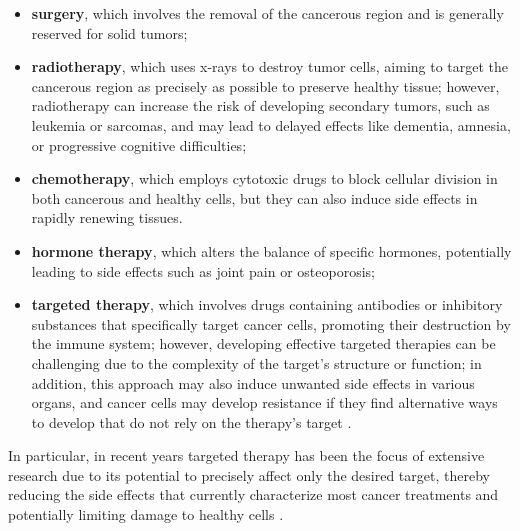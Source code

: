\begin{itemize}
    \item \textbf{surgery}, which involves the removal of the cancerous region and is generally reserved for solid tumors;
    \item \textbf{radiotherapy}, which uses x-rays to destroy tumor cells, aiming to target the cancerous region as precisely as possible to preserve healthy tissue; however, radiotherapy can increase the risk of developing secondary tumors, such as leukemia or sarcomas, and may lead to delayed effects like dementia, amnesia, or progressive cognitive difficulties;
    \item \textbf{chemotherapy}, which employs cytotoxic drugs to block cellular division in both cancerous and healthy cells, but they can also induce side effects in rapidly renewing tissues.
    \item \textbf{hormone therapy}, which alters the balance of specific hormones, potentially leading to side effects such as joint pain or osteoporosis;
    \item \textbf{targeted therapy}, which involves drugs containing antibodies or inhibitory substances that specifically target cancer cells, promoting their destruction by the immune system; however, developing effective targeted therapies can be challenging due to the complexity of the target's structure or function; in addition, this approach may also induce unwanted side effects in various organs, and cancer cells may develop resistance if they find alternative ways to develop that do not rely on the therapy's target \cite{target_therapy1} . \end{itemize}

In particular, in recent years targeted therapy has been the focus of extensive research due to its potential to precisely affect only the desired target, thereby reducing the side effects that currently characterize most cancer treatments and potentially limiting damage to healthy cells \cite{target_therapy3}. 

\cleardoublepage
